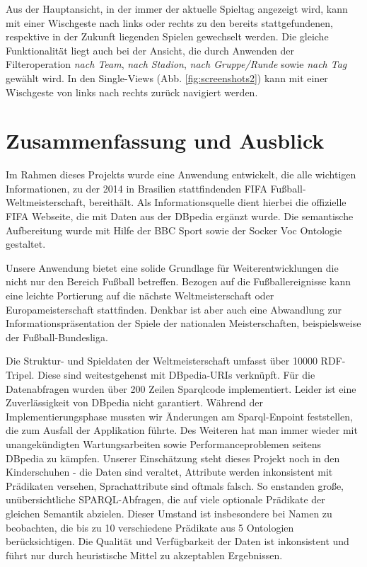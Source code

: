 \documentclass[runningheads,a4paper]{llncs}
\begin{document}
Aus der Hauptansicht, in der immer der aktuelle Spieltag angezeigt wird, kann mit einer Wischgeste nach links oder rechts zu den bereits stattgefundenen, respektive in der Zukunft liegenden Spielen gewechselt werden. Die gleiche Funktionalität liegt auch bei der Ansicht, die durch Anwenden der Filteroperation \textit{nach Team}, \textit{nach Stadion}, \textit{nach Gruppe/Runde} sowie \textit{nach Tag} gewählt wird.
In den Single-Views (Abb. \ref{fig:screenshots2}) kann mit einer Wischgeste von links nach rechts zurück navigiert werden.

\newpage

\section{Zusammenfassung und Ausblick}

Im Rahmen dieses Projekts wurde eine Anwendung entwickelt, die alle wichtigen Informationen, zu der 2014 in Brasilien stattfindenden FIFA Fußball-Weltmeisterschaft, bereithält. Als Informationsquelle dient hierbei die offizielle FIFA Webseite, die mit Daten aus der DBpedia ergänzt wurde. Die semantische Aufbereitung wurde mit Hilfe der BBC Sport sowie der Socker Voc Ontologie gestaltet.  

Unsere Anwendung bietet eine solide Grundlage für Weiterentwicklungen die nicht nur den Bereich Fußball betreffen. Bezogen auf die Fußballereignisse kann eine leichte Portierung auf die nächste Weltmeisterschaft oder Europameisterschaft stattfinden. Denkbar ist aber auch eine Abwandlung zur Informationspräsentation der Spiele der nationalen Meisterschaften, beispielsweise der Fußball-Bundesliga.

Die Struktur- und Spieldaten der Weltmeisterschaft umfasst über 10000 RDF-Tripel. Diese sind weitestgehenst mit DBpedia-URIs verknüpft. Für die Datenabfragen wurden über 200 Zeilen Sparqlcode implementiert. Leider ist eine Zuverlässigkeit von DBpedia nicht garantiert. Während der Implementierungsphase mussten wir Änderungen am Sparql-Enpoint feststellen, die zum Ausfall der Applikation führte. Des Weiteren hat man immer wieder mit unangekündigten Wartungsarbeiten sowie Performanceproblemen seitens DBpedia zu kämpfen. Unserer Einschätzung steht dieses Projekt noch in den Kinderschuhen - die Daten sind veraltet, Attribute werden inkonsistent mit Prädikaten versehen, Sprachattribute sind oftmals falsch. So enstanden große, unübersichtliche SPARQL-Abfragen, die auf viele optionale Prädikate der gleichen Semantik abzielen. Dieser Umstand ist insbesondere bei Namen zu beobachten, die bis zu 10 verschiedene Prädikate aus 5 Ontologien berücksichtigen. Die Qualität und Verfügbarkeit der Daten ist inkonsistent und führt nur durch heuristische Mittel zu akzeptablen Ergebnissen.
\end{document}
